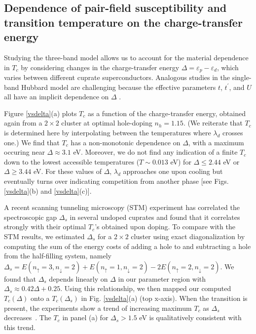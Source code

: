 \documentclass[reprint,nofootinbib,nobibnotes,amsmath,amssymb,aps,prb,floatfix]{revtex4-2}
\newcommand{\figdisp}[1]{Fig. \ref{#1}}
\begin{document}
\subsection{Dependence of pair-field susceptibility and transition temperature on the charge-transfer energy} 
Studying the three-band model allows us to account for the material dependence in $T_c$ by considering changes in the charge-transfer energy $\Delta = \varepsilon_p-\varepsilon_d$, which varies between different cuprate superconductors. Analogous studies in the single-band Hubbard model are challenging because the effective parameters $t$, $t^\prime$, and $U$ all have an implicit dependence on $\Delta$ \cite{Ohta}. 

Figure \ref{vsdelta}(a) plots $T_c$ as a function of the charge-transfer energy, obtained again from a  $2\times2$ cluster at optimal hole-doping $n_h=1.15$. (We reiterate that $T_c$ is determined here by interpolating between the temperatures where $\lambda_d$ crosses one.) We find that $T_c$ has a non-monotonic dependence on $\Delta$, with a maximum occuring near $\Delta \approx 3.1$ eV. Moreover, we do not find any indication of a finite $T_c$ down to the lowest accessible temperatures ($T \sim 0.013$ eV) for $\Delta \le 2.44$ eV or $\Delta \ge 3.44$ eV. For these values of $\Delta$, $\lambda_d$ approaches one upon cooling but eventually turns over indicating competition from another phase [see Figs. \ref{vsdelta}(b) and \ref{vsdelta}(c)]. 



A recent scanning tunneling microscopy (STM) experiment \cite{Ruan} has correlated the spectroscopic gap $\Delta_s$ in several undoped cuprates and found that it correlates strongly with their optimal $T_c$'s obtained upon doping. To compare with the STM results, we estimated  $\Delta_s$ for a $2\times2$ cluster using exact diagonalization by computing 
the sum of the energy costs of adding a hole to and subtracting a hole from the half-filling system, namely $\Delta_s = E(n_\uparrow=3, n_\downarrow=2)+E(n_\uparrow=1, n_\downarrow=2) - 2E(n_\uparrow=2, n_\downarrow=2)$. 
We found that $\Delta_s$ depends linearly on $\Delta$ in our parameter region with $\Delta_s \approx 0.42\Delta+0.25$. Using this 
relationship, we then mapped our computed $T_c(\Delta)$ onto a $T_c(\Delta_s)$ in \figdisp{vsdelta}(a) (top x-axis). When the transition is present, the experiments show a trend of increasing maximum $T_c$ as $\Delta_s$ decreases~\cite{Ruan}. The $T_c$ in panel (a) for $\Delta_s>1.5$ eV is qualitatively consistent with this trend.
\end{document}
